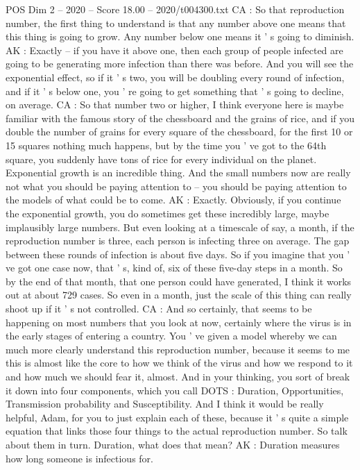 \begin{textsample}{POS Dim 2 – 2020 – Score 18.00 – 2020/t004300.txt}
CA : So that reproduction number, the first thing to understand is that any number above one means that this thing is going to grow.
Any number below one means it ' s going to diminish.
AK : Exactly -- if you have it above one, then each group of people infected are going to be generating more infection than there was before.
And you will see the exponential effect, so if it ' s two, you will be doubling every round of infection, and if it ' s below one, you ' re going to get something that ' s going to decline, on average.
CA : So that number two or higher, I think everyone here is maybe familiar with the famous story of the chessboard and the grains of rice, and if you double the number of grains for every square of the chessboard, for the first 10 or 15 squares nothing much happens, but by the time you ' ve got to the 64th square, you suddenly have tons of rice for every individual on the planet.
Exponential growth is an incredible thing.
And the small numbers now are really not what you should be paying attention to -- you should be paying attention to the models of what could be to come.
AK : Exactly.
Obviously, if you continue the exponential growth, you do sometimes get these incredibly large, maybe implausibly large numbers.
But even looking at a timescale of say, a month, if the reproduction number is three, each person is infecting three on average.
The gap between these rounds of infection is about five days.
So if you imagine that you ' ve got one case now, that ' s, kind of, six of these five-day steps in a month.
So by the end of that month, that one person could have generated, I think it works out at about 729 cases.
So even in a month, just the scale of this thing can really shoot up if it ' s not controlled.
CA : And so certainly, that seems to be happening on most numbers that you look at now, certainly where the virus is in the early stages of entering a country.
You ' ve given a model whereby we can much more clearly understand this reproduction number, because it seems to me this is almost like the core to how we think of the virus and how we respond to it and how much we should fear it, almost.
And in your thinking, you sort of break it down into four components, which you call DOTS : Duration, Opportunities, Transmission probability and Susceptibility.
And I think it would be really helpful, Adam, for you to just explain each of these, because it ' s quite a simple equation that links those four things to the actual reproduction number.
So talk about them in turn.
Duration, what does that mean?
AK : Duration measures how long someone is infectious for.

\end{textsample}
